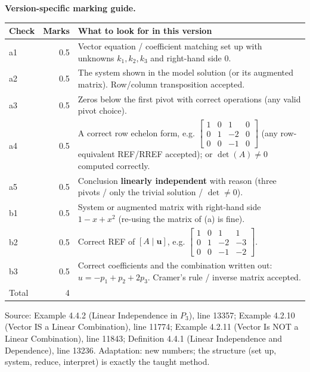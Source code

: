 \documentclass[11pt,a4paper]{article}
\newcommand{\Src}[1]{{\footnotesize\color{black!65}Source: #1}}
\begin{document}
\textbf{Version-specific marking guide.}\par
\begin{tabularx}{\linewidth}{@{}l r X@{}}\toprule Check & Marks & What to look for in this version\\\midrule
a1 & 0.5 & Vector equation / coefficient matching set up with unknowns $k_1,k_2,k_3$ and right-hand side $0$.\\
a2 & 0.5 & The system shown in the model solution (or its augmented matrix). Row/column transposition accepted.\\
a3 & 0.5 & Zeros below the first pivot with correct operations (any valid pivot choice).\\
a4 & 0.5 & A correct row echelon form, e.g. $\left[\begin{array}{ccc|c} 1 & 0 & 1 & 0 \\ 0 & 1 & -2 & 0 \\ 0 & 0 & -1 & 0 \end{array}\right]$ (any row-equivalent REF/RREF accepted); or $\det(A)\neq0$ computed correctly.\\
a5 & 0.5 & Conclusion \textbf{linearly independent} with reason (three pivots / only the trivial solution / $\det\neq0$).\\
b1 & 0.5 & System or augmented matrix with right-hand side $1-x+x^{2}$ (re-using the matrix of (a) is fine).\\
b2 & 0.5 & Correct REF of $[A\mid\mathbf{u}]$, e.g. $\left[\begin{array}{ccc|c} 1 & 0 & 1 & 1 \\ 0 & 1 & -2 & -3 \\ 0 & 0 & -1 & -2 \end{array}\right]$.\\
b3 & 0.5 & Correct coefficients and the combination written out: $u=-p_1+p_2+2p_3$. Cramer's rule / inverse matrix accepted.\\
\midrule Total & 4 & \\\bottomrule\end{tabularx}
\Src{Example 4.4.2 (Linear Independence in $P_3$), line 13357; Example 4.2.10 (Vector IS a Linear Combination), line 11774; Example 4.2.11 (Vector Is NOT a Linear Combination), line 11843; Definition 4.4.1 (Linear Independence and Dependence), line 13236. Adaptation: new numbers; the structure (set up, system, reduce, interpret) is exactly the taught method.}\par
\end{document}
